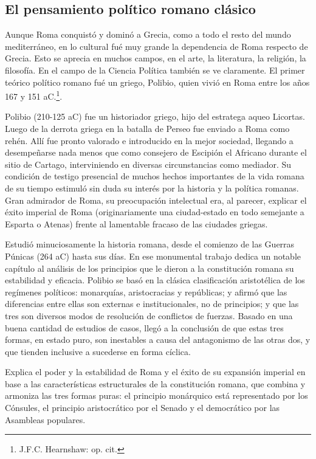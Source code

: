 \documentclass[
]{book}
\begin{document}
\hypertarget{el-pensamiento-poluxedtico-romano-cluxe1sico}{%
\subsection*{El pensamiento político romano clásico}\label{el-pensamiento-poluxedtico-romano-cluxe1sico}}

Aunque Roma conquistó y dominó a Grecia, como a todo el resto del mundo mediterráneo, en lo cultural fué muy grande la dependencia de Roma respecto de Grecia. Esto se aprecia en muchos campos, en el arte, la literatura, la religión, la filosofía. En el campo de la Ciencia Política también se ve claramente. El primer teórico político romano fué un griego, Polibio, quien vivió en Roma entre los años 167 y 151 aC.\footnote{J.F.C. Hearnshaw: op. cit.}.

Polibio (210-125 aC) fue un historiador griego, hijo del estratega aqueo Licortas. Luego de la derrota griega en la batalla de Perseo fue enviado a Roma como rehén. Allí fue pronto valorado e introducido en la mejor sociedad, llegando a desempeñarse nada menos que como consejero de Escipión el Africano durante el sitio de Cartago, interviniendo en diversas circunstancias como mediador. Su condición de testigo presencial de muchos hechos importantes de la vida romana de su tiempo estimuló sin duda su interés por la historia y la política romanas. Gran admirador de Roma, su preocupación intelectual era, al parecer, explicar el éxito imperial de Roma (originariamente una ciudad-estado en todo semejante a Esparta o Atenas) frente al lamentable fracaso de las ciudades griegas.

Estudió minuciosamente la historia romana, desde el comienzo de las Guerras Púnicas (264 aC) hasta sus días. En ese monumental trabajo dedica un notable capítulo al análisis de los principios que le dieron a la constitución romana su estabilidad y eficacia. Polibio se basó en la clásica clasificación aristotélica de los regímenes políticos: monarquías, aristocracias y repúblicas; y afirmó que las diferencias entre ellas son externas e institucionales, no de principios; y que las tres son diversos modos de resolución de conflictos de fuerzas. Basado en una buena cantidad de estudios de casos, llegó a la conclusión de que estas tres formas, en estado puro, son inestables a causa del antagonismo de las otras dos, y que tienden inclusive a sucederse en forma cíclica.

Explica el poder y la estabilidad de Roma y el éxito de su expansión imperial en base a las características estructurales de la constitución romana, que combina y armoniza las tres formas puras: el principio monárquico está representado por los Cónsules, el principio aristocrático por el Senado y el democrático por las Asambleas populares.
\end{document}
